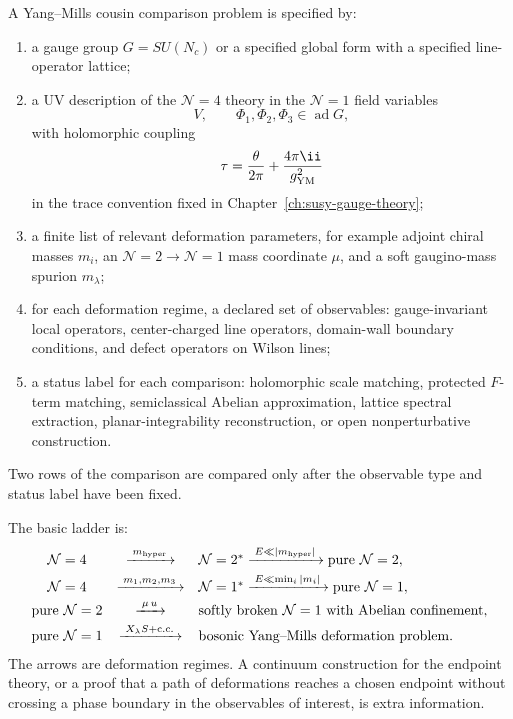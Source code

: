 \begin{definition}
\label{def:ym-cousin-comparison-problem}
A Yang--Mills cousin comparison problem is specified by:
\begin{enumerate}[label=(\roman*)]
\item a gauge group \(G=SU(N_c)\) or a specified global form with a specified
  line-operator lattice;
\item a UV description of the \(\mathcal N=4\) theory in the
  \(\mathcal N=1\) field variables
  \[
    V,\qquad \Phi_1,\Phi_2,\Phi_3\in\operatorname{ad}G,
  \]
  with holomorphic coupling
  \[
    \tau=\frac{\theta}{2\pi}+\frac{4\pi\ii}{g_{\rm YM}^2}
  \]
  in the trace convention fixed in Chapter~\ref{ch:susy-gauge-theory};
\item a finite list of relevant deformation parameters, for example adjoint
  chiral masses \(m_i\), an \(\mathcal N=2\to\mathcal N=1\) mass coordinate
  \(\mu\), and a soft gaugino-mass spurion \(m_\lambda\);
\item for each deformation regime, a declared set of observables:
  gauge-invariant local operators, center-charged line operators, domain-wall
  boundary conditions, and defect operators on Wilson lines;
\item a status label for each comparison: holomorphic scale matching,
  protected \(F\)-term matching, semiclassical Abelian approximation, lattice
  spectral extraction, planar-integrability reconstruction, or open
  nonperturbative construction.
\end{enumerate}
Two rows of the comparison are compared only after the observable type and
status label have been fixed.
\end{definition}

The basic ladder is:
\[
\begin{array}{ccl}
\mathcal N=4
&\xrightarrow{\;m_{\rm hyper}\;}
&\mathcal N=2^\ast
\xrightarrow{\;E\ll |m_{\rm hyper}|\;}
\text{pure }\mathcal N=2,\\[3pt]
\mathcal N=4
&\xrightarrow{\;m_1,m_2,m_3\;}
&\mathcal N=1^\ast
\xrightarrow{\;E\ll \min_i|m_i|\;}
\text{pure }\mathcal N=1,\\[3pt]
\text{pure }\mathcal N=2
&\xrightarrow{\;\mu\,u\;}
&\text{softly broken }\mathcal N=1\text{ with Abelian confinement},\\[3pt]
\text{pure }\mathcal N=1
&\xrightarrow{\;X_\lambda S+\mathrm{c.c.}\;}
&\text{bosonic Yang--Mills deformation problem}.
\end{array}
\]
The arrows are deformation regimes.  A continuum construction for the
endpoint theory, or a proof that a path of deformations reaches a chosen
endpoint without crossing a phase boundary in the observables of interest, is
extra information.

